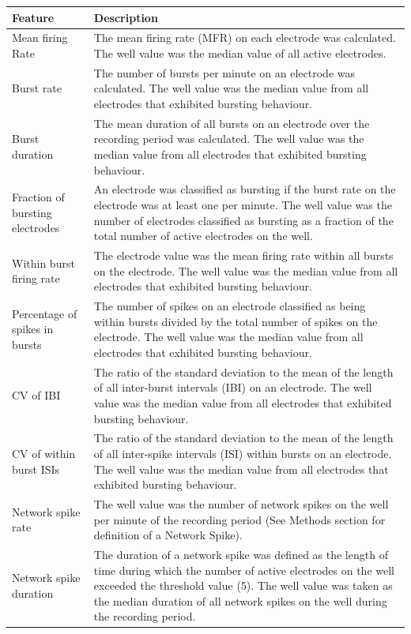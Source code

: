 \documentclass{article}\usepackage[]{graphicx}\usepackage[]{color}
\begin{document}
\begin{table}
  \centering
  	\begin{tabular}{|l|m{11cm}|}
  		\hline
  		Feature & Description
  		\\ \hline 
  		Mean firing Rate & The mean firing rate (MFR) on each electrode was calculated. The well value was the median value of all active electrodes. 
  		\\ Burst rate  & The number of bursts per minute on an electrode was calculated. The well value was the median value from all electrodes that exhibited bursting behaviour. 
  		\\ Burst duration  & The mean duration of all bursts on an electrode over the recording period was calculated. The well value was the median value from all electrodes that exhibited bursting behaviour.
  		\\ Fraction of bursting electrodes  & An electrode was classified as bursting if the burst rate on the electrode was at least one per minute. The well value was the number of electrodes classified as bursting as a fraction of the total number of active electrodes on the well.  
  		\\ Within burst firing rate   & The electrode value was the mean firing rate within all bursts on the electrode. The well value was the median value from all electrodes that exhibited bursting behaviour. 
  		\\ Percentage of spikes in bursts & The number of spikes on an electrode classified as being within bursts divided by the total number of spikes on the electrode. The well value was the median value from all electrodes that exhibited bursting behaviour.  
  		\\ CV of IBI & The ratio of the standard deviation to the mean of the length of all inter-burst intervals (IBI) on an electrode. The well value was the median value from all electrodes that exhibited bursting behaviour.  
  		\\ CV of within burst ISIs &  The ratio of the standard deviation to the mean of the length of all inter-spike intervals (ISI) within bursts on an electrode. The well value was the median value from all electrodes that exhibited bursting behaviour.  
  		\\ Network spike rate &  The well value was the number of network spikes on the well per minute of the recording period (See Methods section for definition of a Network Spike).
  		\\ Network spike duration  & The duration of a network spike was defined as the length of time during which the number of active electrodes on the well exceeded the threshold value (5). The well value was taken as the median duration of all network spikes on the well during the recording period.

\end{tabular}
\end{table}
\end{document}
